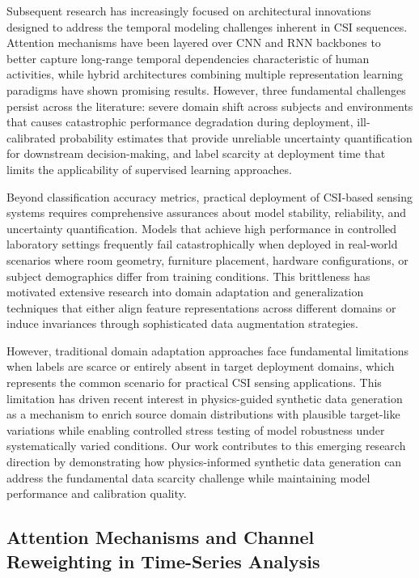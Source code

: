 \documentclass[journal]{IEEEtran}
\begin{document}
Subsequent research has increasingly focused on architectural innovations designed to address the temporal modeling challenges inherent in CSI sequences. Attention mechanisms have been layered over CNN and RNN backbones to better capture long-range temporal dependencies characteristic of human activities, while hybrid architectures combining multiple representation learning paradigms have shown promising results. However, three fundamental challenges persist across the literature: severe domain shift across subjects and environments that causes catastrophic performance degradation during deployment, ill-calibrated probability estimates that provide unreliable uncertainty quantification for downstream decision-making, and label scarcity at deployment time that limits the applicability of supervised learning approaches.

Beyond classification accuracy metrics, practical deployment of CSI-based sensing systems requires comprehensive assurances about model stability, reliability, and uncertainty quantification. Models that achieve high performance in controlled laboratory settings frequently fail catastrophically when deployed in real-world scenarios where room geometry, furniture placement, hardware configurations, or subject demographics differ from training conditions. This brittleness has motivated extensive research into domain adaptation and generalization techniques that either align feature representations across different domains or induce invariances through sophisticated data augmentation strategies.

However, traditional domain adaptation approaches face fundamental limitations when labels are scarce or entirely absent in target deployment domains, which represents the common scenario for practical CSI sensing applications. This limitation has driven recent interest in physics-guided synthetic data generation as a mechanism to enrich source domain distributions with plausible target-like variations while enabling controlled stress testing of model robustness under systematically varied conditions. Our work contributes to this emerging research direction by demonstrating how physics-informed synthetic data generation can address the fundamental data scarcity challenge while maintaining model performance and calibration quality.

\subsection{Attention Mechanisms and Channel Reweighting in Time-Series Analysis}
\end{document}

